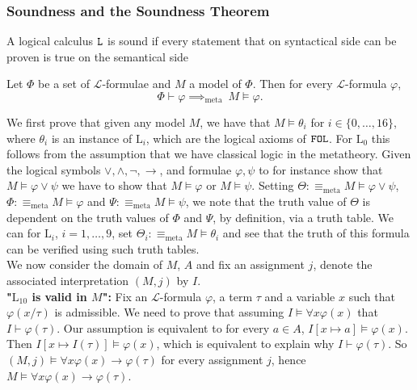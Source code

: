 \subsubsection{Soundness and the Soundness Theorem}
\begin{definition}
    A logical calculus $\verb|L|$ is sound if every statement that on syntactical side can be proven is true on the semantical side
\end{definition}
\begin{theorem}
    Let $\Phi$ be a set of $\mathcal{L}$-formulae and $M$ a model of $\Phi$. Then for every $\mathcal{L}$-formula $\varphi$,
    $$\Phi \vdash \varphi \implies_{\mathrm{meta}}\ M \vDash \varphi.$$
\end{theorem}
\begin{proofsketch}
    We first prove that given any model $M$, we have that $M\vDash \theta_i$ for $i\in \{0,\dots,16\}$, where $\theta_i$ is an instance of $\mathrm{L}_i$, which are the logical axioms of $\verb|FOL|$. For $\mathrm{L}_0$ this follows from the assumption that we have classical logic in the metatheory.  Given the logical symbols $\vee,\wedge, \neg, \to$, and formulae $\varphi,\psi$ to for instance show that $M\vDash \varphi \vee \psi$ we have to show that $M\vDash \varphi$ or $M\vDash \psi$. Setting $\Theta:\equiv_{\mathrm{meta}} M\vDash \varphi \vee \psi$, $\Phi :\equiv_{\mathrm{meta}} M\vDash \varphi$ and $\Psi :\equiv_{\mathrm{meta}} M\vDash \psi$, we note that the truth value of $\Theta$ is dependent on the truth values of $\Phi$ and $\Psi$, by definition, via a truth table. We can for $\mathrm{L}_i$, $i=1,\dots,9$, set $\Theta_i :\equiv_{\mathrm{meta}} M\vDash \theta_i$ and see that the truth of this formula can be verified using such truth tables.\\
    We now consider the domain of $M$, $A$ and fix an assignment $j$, denote the associated interpretation $(M,j)$ by $I$.\\ 
    \textbf{"$\mathrm{L}_{10}$ is valid in $M$":} Fix an $\mathcal{L}$-formula $\varphi$, a term $\tau$ and a variable $x$ such that $\varphi(x/\tau)$ is admissible. We need to prove that assuming $I\vDash \forall x\varphi(x)$ that $I\vdash \varphi(\tau)$. Our assumption is equivalent to for every $a\in A$, $I[x\mapsto a]\vDash \varphi(x)$. Then $I[x\mapsto I(\tau)] \vDash \varphi(x)$, which is equivalent to {\Large explain why} $I \vdash  \varphi(\tau)$. So $(M,j)\vDash \forall x\varphi(x) \to \varphi(\tau)$ for every assignment $j$, hence $M\vDash \forall x\varphi(x)\to \varphi(\tau)$.\\

\end{proofsketch}
